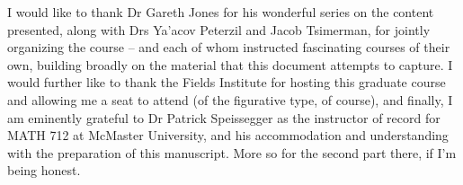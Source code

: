 %
%


I would like to thank Dr Gareth Jones for his wonderful series on the content presented, along with Drs Ya'acov Peterzil and Jacob Tsimerman, for jointly organizing the course -- and each of whom instructed fascinating courses of their own, building broadly on the material that this document attempts to capture. I would further like to thank the Fields Institute for hosting this graduate course and allowing me a seat to attend (of the figurative type, of course), and finally, I am eminently grateful to Dr Patrick Speissegger as the instructor of record for MATH 712 at McMaster University, and his accommodation and understanding with the preparation of this manuscript. More so for the second part there, if I'm being honest.
